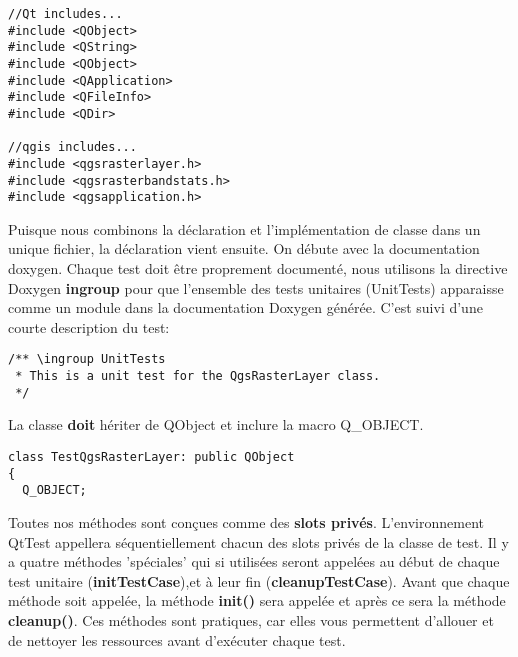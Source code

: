 \begin{verbatim}
//Qt includes...
#include <QObject>
#include <QString>
#include <QObject>
#include <QApplication>
#include <QFileInfo>
#include <QDir>

//qgis includes...
#include <qgsrasterlayer.h> 
#include <qgsrasterbandstats.h> 
#include <qgsapplication.h>
\end{verbatim}

Puisque nous combinons la d\'eclaration et l'impl\'ementation de classe dans un unique fichier, la d\'eclaration vient ensuite. On d\'ebute avec la documentation doxygen. Chaque test doit \^etre proprement document\'e, nous utilisons la directive Doxygen \textbf{ingroup} pour que l'ensemble des tests unitaires (UnitTests) apparaisse comme un module dans la documentation Doxygen g\'en\'er\'ee. C'est suivi d'une courte description du test:

\begin{verbatim}
/** \ingroup UnitTests
 * This is a unit test for the QgsRasterLayer class.
 */
\end{verbatim}

La classe \textbf{doit} h\'eriter de QObject et inclure la macro Q\_OBJECT.

\begin{verbatim}
class TestQgsRasterLayer: public QObject
{
  Q_OBJECT;
\end{verbatim}
Toutes nos m\'ethodes sont con\c{c}ues comme des \textbf{slots priv\'es}. L'environnement QtTest appellera s\'equentiellement chacun des slots priv\'es de la classe de test. Il y a quatre m\'ethodes 'sp\'eciales' qui si utilis\'ees seront appel\'ees au d\'ebut de chaque test unitaire (\textbf{initTestCase}),et \`a leur fin (\textbf{cleanupTestCase}).  Avant que chaque m\'ethode soit appel\'ee, la m\'ethode \textbf{init()} sera appel\'ee et apr\`es ce sera la m\'ethode  \textbf{cleanup()}. Ces m\'ethodes sont pratiques, car elles vous permettent d'allouer et de nettoyer les ressources avant d'ex\'ecuter chaque test.

